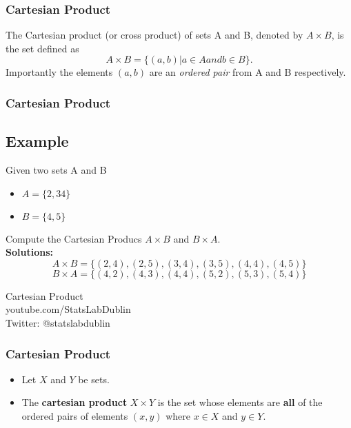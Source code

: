 \documentclass[Relations-MASTER.tex]{subfiles}
\begin{document}
	


\begin{frame}
	\frametitle{Cartesian Product}
The Cartesian product (or cross product) of sets A and B, denoted by
$A \times B$, is the set defined as
\[A \times  B = \{(a, b) | a \in A and b \in B\}.\]
Importantly the elements $(a, b)$ are an \textit{ordered pair} from A and B respectively.
\end{frame}
\begin{frame}
	\frametitle{Cartesian Product}
\subsection*{Example}
Given two sets A and B
\begin{itemize}
\item $A = \{2, 3 4\}$
\item $B = \{4, 5\}$
\end{itemize}
Compute the Cartesian Producs $A\times B$ and $B \times A$.\\
\textbf{Solutions:}
\[ A\times B = \{(2, 4),(2, 5),(3, 4),(3, 5),(4, 4),(4, 5)\}\]
\[ B\times A = \{(4, 2),(4, 3),(4, 4),(5, 2),(5, 3),(5, 4)\}\]

\begin{frame}
	\begin{center}
		{ \Huge
			Cartesian Product }
		\\
		\bigskip
		{ \Large
			youtube.com/StatsLabDublin \\ \vspace{0.2cm} Twitter: @statslabdublin
		}
	\end{center}
\end{frame}
\begin{frame}
	\frametitle{Cartesian Product}
	{\LARGE
		\begin{itemize}
			\item Let $X$ and $Y$ be sets.
			\item The \textbf{cartesian product} $X \times Y$ is the set whose elements are \textbf{all} of the ordered pairs of elements $(x,y)$ where $x \in X$ and $y \in Y$.
		\end{itemize}
	}
	
	

\end{frame}
\end{frame}
\end{document}
